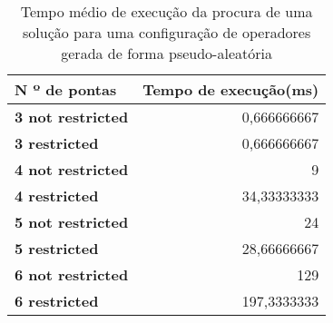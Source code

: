 
\begin{table}[htbp]
  \centering
  \caption{Tempo médio de execução da procura de uma solução para uma configuração de operadores gerada de forma pseudo-aleatória}
    \begin{tabular}{lr} \hline
    \textbf{N º de pontas} & \multicolumn{1}{l}{\textbf{Tempo de execução(ms)}} \\ \hline
    \textbf{3 not restricted} & 0,666666667 \\
    \textbf{3 restricted} & 0,666666667 \\
    \textbf{4 not restricted} & 9 \\
    \textbf{4 restricted} & 34,33333333 \\
    \textbf{5 not restricted} & 24 \\
    \textbf{5 restricted} & 28,66666667 \\
    \textbf{6 not restricted} & 129 \\
    \textbf{6 restricted} & 197,3333333 \\ \hline
    \end{tabular}%
  \label{tab:tabela_random}%
\end{table}%


